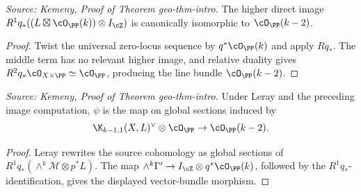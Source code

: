 \begin{lemma}
  \label{lem:kemeny_R1q_line_bundle}
  \textit{Source: Kemeny, Proof of Theorem geo-thm-intro.}
  The higher direct image
  \(R^1q_*((L\boxtimes\cO_{\PP}(k))\otimes I_{\cZ})\) is canonically
  isomorphic to \(\cO_{\PP}(k-2)\).
\end{lemma}
\begin{proof}
  Twist the universal zero-locus sequence by \(q^*\cO_{\PP}(k)\) and apply
  \(Rq_*\).  The middle term has no relevant higher image, and relative duality
  gives \(R^2q_*\cO_{X\times\PP}\simeq\cO_{\PP}\), producing the line bundle
  \(\cO_{\PP}(k-2)\).
\end{proof}

\begin{lemma}
  \label{lem:kemeny_psi_global_sections}
  \textit{Source: Kemeny, Proof of Theorem geo-thm-intro.}
  Under Leray and the preceding image computation, \(\psi\) is the map on global
  sections induced by
  \[
    \K_{k-1,1}(X,L)^\vee\otimes\cO_{\PP}\to\cO_{\PP}(k-2).
  \]
\end{lemma}
\begin{proof}
  Leray rewrites the source cohomology as global sections of
  \(R^1q_*(\wedge^k\mathcal M\otimes p^*L)\).  The map
  \(\wedge^k\Gamma'\to I_{\cZ}\otimes q^*\cO_{\PP}(k)\), followed by the
  \(R^1q_*\)-identification, gives the displayed vector-bundle morphism.
\end{proof}

